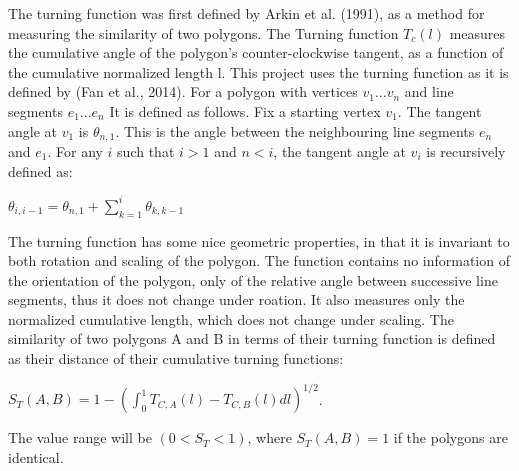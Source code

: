 \documentclass[a4paper]{article}
\begin{document}
The turning function was first defined by Arkin et al. (1991), as a method for measuring the similarity of two polygons. The Turning function $T_c(l)$ measures the cumulative angle of the polygon's counter-clockwise tangent, as a function of the cumulative normalized length l. This project uses the turning function as it is defined by (Fan et al., 2014). For a polygon with vertices ${v_1 ... v_n}$ and line segments ${e_1 ... e_n}$ It is defined as follows.
Fix a starting vertex $v_1$.
The tangent angle at $v_1$ is $\theta_{n,1}$. This is the angle between the neighbouring line segments $e_n$ and $e_1$.
For any $i$ such that $i>1$ and $n<i$, the tangent angle at $v_i$ is recursively defined as:
\begin{center}
    $\theta_{i, i-1} = \theta_{n,1} + \sum^{i}_{k=1} \theta_{k, k-1}$
\end{center}
The turning function has some nice geometric properties, in that it is invariant to both rotation and scaling of the polygon. The function contains no information of the orientation of the polygon, only of the relative angle between successive line segments, thus it does not change under roation. It also measures only the normalized cumulative length, which does not change under scaling.
The similarity of two polygons A and B in terms of their turning function is defined as their distance of their cumulative turning functions:
\begin{center}
    $S_{T}(A, B) = 1 - (\int^{1}_{0} T_{C,A}(l) - T_{C,B}(l) dl)^{1/2}$.
\end{center}
The value range will be $(0 < S_{T} < 1)$, where $S_{T}(A,B) = 1$ if the polygons are identical. 



\end{document}
